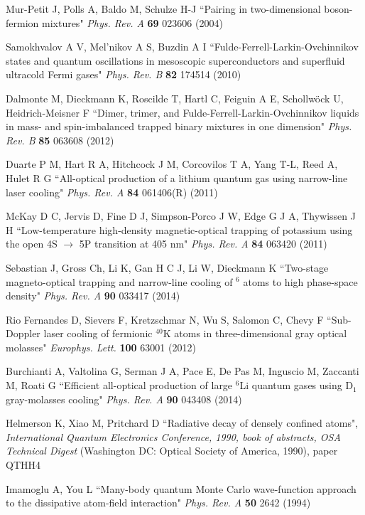 \documentclass[pra,letterpaper,twocolumn,showpacs,superscriptaddress]{revtex4}
\begin{document}
\begin{thebibliography}{300}
 Mur-Petit J, Polls A, Baldo M, Schulze H-J
``Pairing in two-dimensional boson-fermion mixtures"
{\it Phys. Rev. A} \textbf{69} 023606 (2004)

 Samokhvalov A V, Mel'nikov A S, Buzdin A I 
``Fulde-Ferrell-Larkin-Ovchinnikov states and quantum oscillations in mesoscopic superconductors and superfluid ultracold Fermi gases"
{\it Phys. Rev. B} \textbf{82} 174514 (2010)

 Dalmonte M, Dieckmann K, Roscilde T, Hartl C, Feiguin A E, Schollw\"ock U, Heidrich-Meisner F
``Dimer, trimer, and Fulde-Ferrell-Larkin-Ovchinnikov liquids in mass- and spin-imbalanced trapped binary mixtures in one dimension"
{\it Phys. Rev. B} \textbf{85} 063608 (2012)

 Duarte P M, Hart R A, Hitchcock J M, Corcovilos T A, Yang T-L, Reed A, Hulet R G
``All-optical production of a lithium quantum gas using narrow-line laser cooling"
{\it Phys. Rev. A} \textbf{84} 061406(R) (2011)

 McKay D C, Jervis D, Fine D J, Simpson-Porco J W, Edge G J A, Thywissen J H 
``Low-temperature high-density magnetic-optical trapping of potassium using the open 4S $\rightarrow$ 5P transition at 405 nm"
{\it Phys. Rev. A} \textbf{84} 063420 (2011)

 Sebastian J, Gross Ch, Li K, Gan H C J, Li W, Dieckmann K 
``Two-stage magneto-optical trapping and narrow-line cooling of ${}^6$ atoms to high phase-space density"
{\it Phys. Rev. A} \textbf{90} 033417 (2014)

 Rio Fernandes D, Sievers F, Kretzschmar N, Wu S, Salomon C, Chevy F
``Sub-Doppler laser cooling of fermionic ${}^{40}$K atoms in three-dimensional gray optical molasses"
{\it Europhys. Lett.} \textbf{100} 63001 (2012)

 Burchianti A, Valtolina G, Serman J A, Pace E, De Pas M, Inguscio M, Zaccanti M, Roati G 
``Efficient all-optical production of large ${}^6$Li quantum gases using D${}_1$ gray-molasses cooling"
{\it Phys. Rev. A} \textbf{90} 043408 (2014)

 Helmerson K, Xiao M, Pritchard D 
``Radiative decay of densely confined atoms", {\it International Quantum Electronics Conference, 1990, 
book of abstracts, OSA Technical Digest} (Washington DC: Optical Society of America, 1990), paper QTHH4

 Imamoglu A, You L
``Many-body quantum Monte Carlo wave-function approach to the dissipative atom-field interaction"
{\it Phys. Rev. A} \textbf{50} 2642 (1994)


\end{thebibliography}
\end{document}
